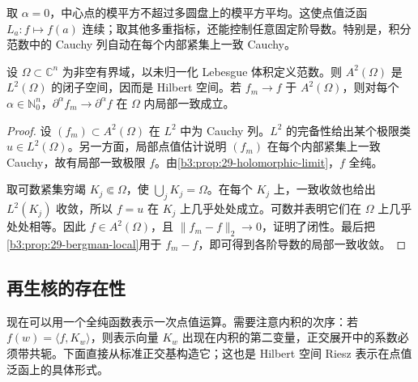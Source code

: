 取 \(\alpha=0\)，中心点的模平方不超过多圆盘上的模平方平均。这使点值泛函 \(L_a:f\mapsto f(a)\) 连续；取其他多重指标，还能控制任意固定阶导数。特别是，积分范数中的 Cauchy 列自动在每个内部紧集上一致 Cauchy。

\begin{theorem}\label{b3:thm:29-bergman-closed}
设 \(\Omega\subset\mathbb C^n\) 为非空有界域，以未归一化 Lebesgue 体积定义范数。则 \(A^2(\Omega)\) 是 \(L^2(\Omega)\) 的闭子空间，因而是 Hilbert 空间。若 \(f_m\to f\) 于 \(A^2(\Omega)\)，则对每个 \(\alpha\in\mathbb N_0^n\)，\(\partial^\alpha f_m\to\partial^\alpha f\) 在 \(\Omega\) 内局部一致成立。
\end{theorem}
\begin{proof}
设 \((f_m)\subset A^2(\Omega)\) 在 \(L^2\) 中为 Cauchy 列。\(L^2\) 的完备性给出某个极限类 \(u\in L^2(\Omega)\)。另一方面，局部点值估计说明 \((f_m)\) 在每个内部紧集上一致 Cauchy，故有局部一致极限 \(f\)。由\cref{b3:prop:29-holomorphic-limit}，\(f\) 全纯。

取可数紧集穷竭 \(K_j\Subset\Omega\)，使 \(\bigcup_jK_j=\Omega\)。在每个 \(K_j\) 上，一致收敛也给出 \(L^2(K_j)\) 收敛，所以 \(f=u\) 在 \(K_j\) 上几乎处处成立。可数并表明它们在 \(\Omega\) 上几乎处处相等。因此 \(f\in A^2(\Omega)\)，且 \(\|f_m-f\|_2\to0\)，证明了闭性。最后把\cref{b3:prop:29-bergman-local}用于 \(f_m-f\)，即可得到各阶导数的局部一致收敛。
\end{proof}

\subsection{再生核的存在性}
\label{b3:subsec:290603}

现在可以用一个全纯函数表示一次点值运算。需要注意内积的次序：若 \(f(w)=\langle f,K_w\rangle\)，则表示向量 \(K_w\) 出现在内积的第二变量，正交展开中的系数必须带共轭。下面直接从标准正交基构造它；这也是 Hilbert 空间 Riesz 表示在点值泛函上的具体形式。

